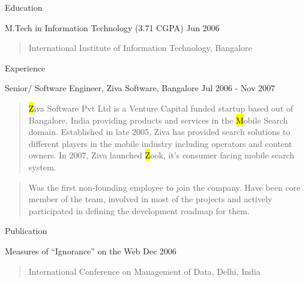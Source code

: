 \documentclass{resume}
\author{Siddhartha Reddy Kothakapu}
\begin{document}
 \maketitle

\begin{category}{Education}{}

    \item {\topic M.Tech in Information Technology}
        {\footnotesize(3.71 CGPA)}
        {\period Jun 2006}
        \begin{quote}
            International Institute of Information Technology, Bangalore
        \end{quote}

\end{category}


\begin{category}{Experience}{}

    \item {\topic Senior/ Software Engineer,} Ziva Software, Bangalore
        {\period Jul 2006 - Nov 2007}
        \begin{quote}
            {\hl Ziva Software Pvt Ltd} is a Venture Capital funded startup based
            out of Bangalore, India providing products and services in the {\hl
            Mobile Search} domain. Established in late 2005, Ziva has provided
            search solutions to different players in the mobile industry including
            operators and content owners. In 2007, Ziva launched {\hl Zook}, it's
            consumer facing mobile search system.
        \end{quote}
        \begin{quote}
            Was the first non-founding employee to join the company. Have been core
            member of the team, involved in most of the projects and actively
            participated in defining the development roadmap for them.
        \end{quote}

\end{category}


\begin{category}{Publication}{}

    \item {\topic Measures of ``Ignorance'' on the Web}
        {\period Dec 2006}
        \begin{quote}
            International Conference on Management of Data, Delhi, India
        \end{quote}

\end{category}
\end{document}
